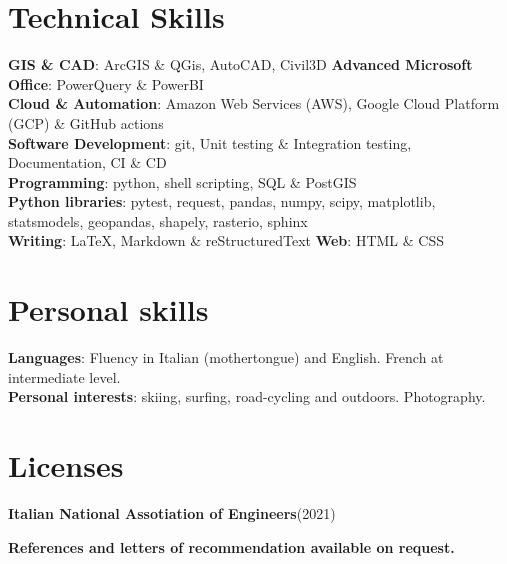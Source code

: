 \documentclass[letterpaper,11pt]{article}
\begin{document}
\section{Technical Skills}
 \begin{itemize}[leftmargin=0.15in, label={}]
    \small{\item{
     \textbf{GIS \& CAD}{: ArcGIS \& QGis, AutoCAD, Civil3D} \textbf{Advanced Microsoft Office}{: PowerQuery \& PowerBI} \\
     \textbf{Cloud \& Automation}{: Amazon Web Services (AWS), Google Cloud Platform (GCP) \& GitHub actions}\\
     \textbf{Software Development}{: git, Unit testing \& Integration testing, Documentation, CI \& CD}\\
     \textbf{Programming}{: python, shell scripting, SQL \& PostGIS}\\
     \textbf{Python libraries}{: pytest, request, pandas, numpy, scipy, matplotlib, statsmodels, geopandas, shapely, rasterio, sphinx}\\
     \textbf{Writing}{: \LaTeX\:, Markdown \& reStructuredText}     \textbf{Web}{: HTML \& CSS}\\
    }}
 \end{itemize}


\section{Personal skills}
 \begin{itemize}[leftmargin=0.15in, label={}]
    \small{\item{
     \textbf{Languages}{: Fluency in Italian (mothertongue) and English. French at intermediate level.} \\
     \textbf{Personal interests}{: skiing, surfing, road-cycling and outdoors. Photography.}\\
    }}
 \end{itemize}

\section{Licenses}
 \begin{itemize}[leftmargin=0.15in, label={}]
    \small{\item{
     \textbf{Italian National Assotiation of Engineers}{(2021)} \\}}
 \end{itemize}

\centering
\textbf{References and letters of recommendation available on request.}

\end{document}
